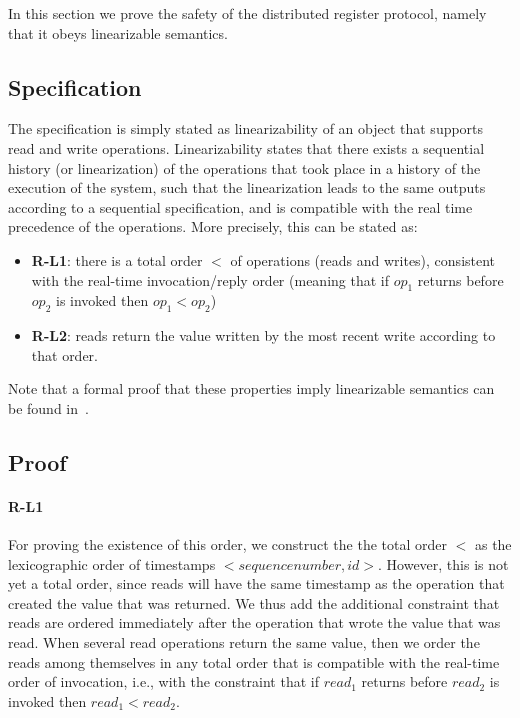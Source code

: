 In this section we prove the safety of the distributed register
protocol, namely that it obeys linearizable semantics.


\subsection{Specification}

The specification is simply stated as linearizability of an
object that supports read and write operations.
Linearizability states that there exists a sequential history (or
linearization) of the operations that took place in a history
of the execution of the system, such that the linearization leads
to the same outputs according to a sequential specification, and is
compatible with the real time precedence of the operations. More
precisely, this can be stated as:

\begin{itemize}
    \item[] \textbf{R-L1}: there is a total order $<$ of
        operations (reads and writes), consistent with the
        real-time invocation/reply order (meaning that if $op_1$
        returns before $op_2$ is invoked then $op_1 < op_2$)
    \item[] \textbf{R-L2}: reads return the value written by the
        most recent write according to that order.
\end{itemize}

Note that a formal proof that these properties imply linearizable semantics
can be found in~\cite{nancy-book}.

\subsection{Proof}

\paragraph{R-L1}
For proving the existence of this order, we construct the
the total order $<$ as the
lexicographic order of timestamps $<sequence number, id>$.
However, this is not yet a total order, since reads will have the same
timestamp as the operation that created the value that was returned. We
thus add the additional constraint that reads are ordered immediately
after the operation that wrote the value that was read. When several
read operations return the same value, then we order the
reads among themselves in any total order that is compatible with the
real-time order of invocation, i.e., with the constraint that
if $read_1$ returns before $read_2$ is invoked then $read_1 < read_2$.

